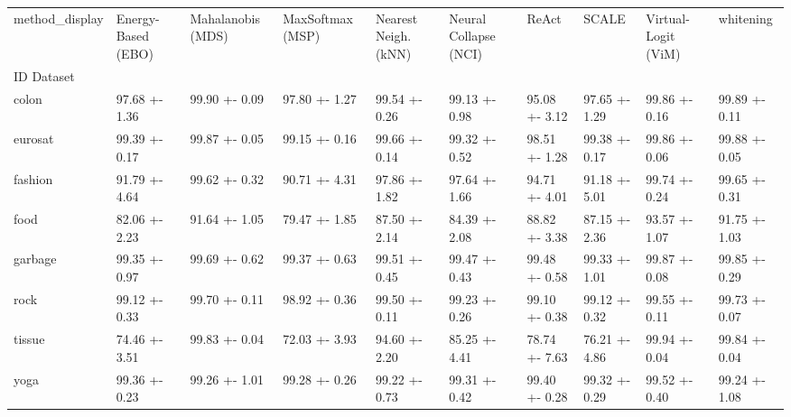 \begin{tabular}{llllllllll}
\toprule
method_display & Energy-Based (EBO) & Mahalanobis (MDS) & MaxSoftmax (MSP) & Nearest Neigh. (kNN) & Neural Collapse (NCI) & ReAct & SCALE & Virtual-Logit (ViM) & whitening \\
ID Dataset &  &  &  &  &  &  &  &  &  \\
\midrule
colon & 97.68 +- 1.36 & 99.90 +- 0.09 & 97.80 +- 1.27 & 99.54 +- 0.26 & 99.13 +- 0.98 & 95.08 +- 3.12 & 97.65 +- 1.29 & 99.86 +- 0.16 & 99.89 +- 0.11 \\
eurosat & 99.39 +- 0.17 & 99.87 +- 0.05 & 99.15 +- 0.16 & 99.66 +- 0.14 & 99.32 +- 0.52 & 98.51 +- 1.28 & 99.38 +- 0.17 & 99.86 +- 0.06 & 99.88 +- 0.05 \\
fashion & 91.79 +- 4.64 & 99.62 +- 0.32 & 90.71 +- 4.31 & 97.86 +- 1.82 & 97.64 +- 1.66 & 94.71 +- 4.01 & 91.18 +- 5.01 & 99.74 +- 0.24 & 99.65 +- 0.31 \\
food & 82.06 +- 2.23 & 91.64 +- 1.05 & 79.47 +- 1.85 & 87.50 +- 2.14 & 84.39 +- 2.08 & 88.82 +- 3.38 & 87.15 +- 2.36 & 93.57 +- 1.07 & 91.75 +- 1.03 \\
garbage & 99.35 +- 0.97 & 99.69 +- 0.62 & 99.37 +- 0.63 & 99.51 +- 0.45 & 99.47 +- 0.43 & 99.48 +- 0.58 & 99.33 +- 1.01 & 99.87 +- 0.08 & 99.85 +- 0.29 \\
rock & 99.12 +- 0.33 & 99.70 +- 0.11 & 98.92 +- 0.36 & 99.50 +- 0.11 & 99.23 +- 0.26 & 99.10 +- 0.38 & 99.12 +- 0.32 & 99.55 +- 0.11 & 99.73 +- 0.07 \\
tissue & 74.46 +- 3.51 & 99.83 +- 0.04 & 72.03 +- 3.93 & 94.60 +- 2.20 & 85.25 +- 4.41 & 78.74 +- 7.63 & 76.21 +- 4.86 & 99.94 +- 0.04 & 99.84 +- 0.04 \\
yoga & 99.36 +- 0.23 & 99.26 +- 1.01 & 99.28 +- 0.26 & 99.22 +- 0.73 & 99.31 +- 0.42 & 99.40 +- 0.28 & 99.32 +- 0.29 & 99.52 +- 0.40 & 99.24 +- 1.08 \\
\bottomrule
\end{tabular}
